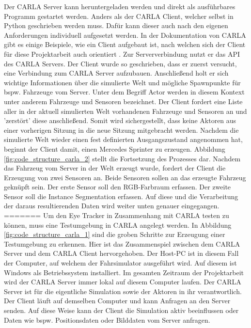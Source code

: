 Der CARLA Server kann heruntergeladen werden und direkt als ausführbares Programm gestartet werden. Anders als der CARLA Client, welcher selbst in Python geschrieben werden muss. Dafür kann dieser auch nach den eigenen Anforderungen individuell aufgesetzt werden. In der Dokumentation von CARLA gibt es einige Beispiele, wie ein Client aufgebaut ist, nach welchen sich der Client für diese Projektarbeit auch orientiert \cite{lit_code_api}. Zur Serververbindung nutzt er das {\ac{API}} des CARLA Servers. Der Client wurde so geschrieben, dass er zuerst versucht, eine Verbindung zum CARLA Server aufzubauen. Anschließend holt er sich wichtige Informationen über die simulierte Welt und mögliche Spawnpunkte für bspw. Fahrzeuge vom Server. Unter dem Begriff \Gls{Actor} werden in diesem Kontext unter anderem Fahrzeuge und Sensoren bezeichnet. Der Client fordert eine Liste aller in der aktuell simulierten Welt vorhandenen Fahrzeuge und Sensoren an und 'zerstört' diese anschließend. Somit wird sichergestellt, dass keine Aktoren aus einer vorherigen Sitzung in die neue Sitzung mitgebracht werden. Nachdem die simulierte Welt wieder einen fest definierten Ausgangszustand angenommen hat, beginnt der Client damit, einen Mercedes Sprinter zu erzeugen. Abbildung \ref{fig:code_structure_carla_2} stellt die Fortsetzung des Prozesses dar. Nachdem das Fahrzeug vom Server in der Welt erzeugt wurde, fordert der Client die Erzeugung von zwei Sensoren an. Beide Sensoren sollen an das erzeugte Fahrzeug geknüpft sein. Der erste Sensor soll den {\ac{RGB}}-Farbraum erfassen. Der zweite Sensor soll die Instance Segmentation erfassen. Auf diese und die Verarbeitung der daraus resultierenden Daten wird weiter unten genauer eingegangen. 
=======
Um den Eye Tracker in Zusammenhang mit CARLA testen zu können, muss eine Testumgebung in CARLA angelegt werden. In Abbildung \ref{fig:code_structure_carla_1} sind die groben Schritte zur Erzeugung einer Testumgebung zu erkennen. Hier ist das Zusammenspiel zwischen dem CARLA Server und dem CARLA Client hervorgehoben. Der Host-PC ist in diesem Fall der Computer, auf welchem der Fahrsimulator ausgeführt wird. Auf diesem ist Windows als Betriebssystem installiert. Im gesamten Zeitraum der Projektarbeit wird der CARLA Server immer lokal auf diesem Computer laufen. Der CARLA Server ist für die eigentliche Simulation sowie der Aktoren in ihr verantwortlich. Der Client läuft auf demselben Computer und kann Anfragen an den Server senden. Auf diese Weise kann der Client die Simulation aktiv beeinflussen oder Daten wie bspw. Positionsdaten oder Bilddaten vom Server anfragen. \cite{lit_website_carla_documentation}

